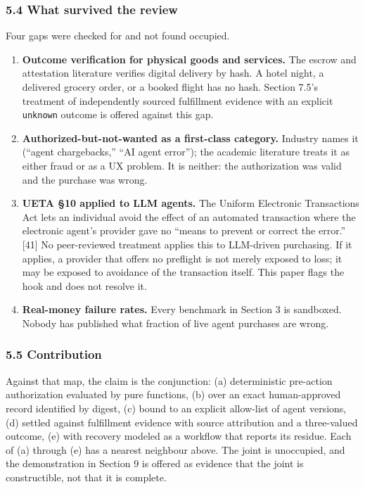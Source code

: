 \documentclass[
  11pt,
  letterpaper,
]{article}
\providecommand{\tightlist}{%
  \setlength{\itemsep}{0pt}\setlength{\parskip}{0pt}}
\begin{document}
\subsubsection{5.4 What survived the
review}\label{what-survived-the-review}

Four gaps were checked for and not found occupied.

\begin{enumerate}
\def\labelenumi{\arabic{enumi}.}
\tightlist
\item
  \textbf{Outcome verification for physical goods and services.} The
  escrow and attestation literature verifies digital delivery by hash. A
  hotel night, a delivered grocery order, or a booked flight has no
  hash. Section 7.5's treatment of independently sourced fulfillment
  evidence with an explicit \texttt{unknown} outcome is offered against
  this gap.
\item
  \textbf{Authorized-but-not-wanted as a first-class category.} Industry
  names it (``agent chargebacks,'' ``AI agent error''); the academic
  literature treats it as either fraud or as a UX problem. It is
  neither: the authorization was valid and the purchase was wrong.
\item
  \textbf{UETA §10 applied to LLM agents.} The Uniform Electronic
  Transactions Act lets an individual avoid the effect of an automated
  transaction where the electronic agent's provider gave no ``means to
  prevent or correct the error.'' {[}41{]} No peer-reviewed treatment
  applies this to LLM-driven purchasing. If it applies, a provider that
  offers no preflight is not merely exposed to loss; it may be exposed
  to avoidance of the transaction itself. This paper flags the hook and
  does not resolve it.
\item
  \textbf{Real-money failure rates.} Every benchmark in Section 3 is
  sandboxed. Nobody has published what fraction of live agent purchases
  are wrong.
\end{enumerate}

\subsubsection{5.5 Contribution}\label{contribution}

Against that map, the claim is the conjunction: (a) deterministic
pre-action authorization evaluated by pure functions, (b) over an exact
human-approved record identified by digest, (c) bound to an explicit
allow-list of agent versions, (d) settled against fulfillment evidence
with source attribution and a three-valued outcome, (e) with recovery
modeled as a workflow that reports its residue. Each of (a) through (e)
has a nearest neighbour above. The joint is unoccupied, and the
demonstration in Section 9 is offered as evidence that the joint is
constructible, not that it is complete.
\end{document}
